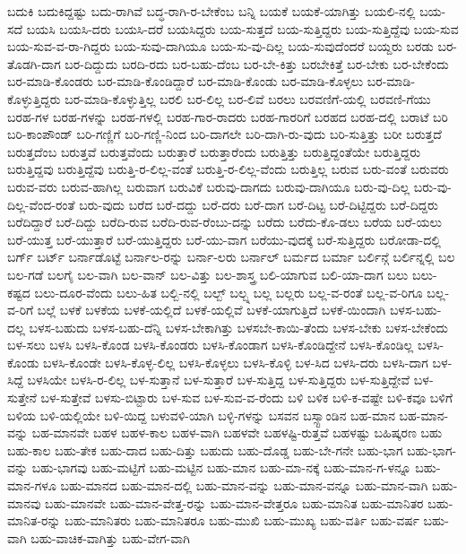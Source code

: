 {ಬದುಕಿ
ಬದುಕಿದ್ದಷ್ಟು
ಬದು-ರಾಗಿವೆ
ಬದ್ಧ-ರಾಗಿ-ರ-ಬೇಕೆಂಬ
ಬನ್ನಿ
ಬಯಕೆ
ಬಯಕೆ-ಯಾಗಿತ್ತು
ಬಯಲಿ-ನಲ್ಲಿ
ಬಯ-ಸದೆ
ಬಯಸಿ
ಬಯಸಿ-ದರು
ಬಯಸಿ-ದರೆ
ಬಯಸಿದ್ದರು
ಬಯ-ಸುತ್ತದೆ
ಬಯ-ಸುತ್ತಿದ್ದರು
ಬಯ-ಸುತ್ತಿದ್ದೆವು
ಬಯ-ಸುವ
ಬಯ-ಸುವ-ವ-ರಾ-ಗಿದ್ದರು
ಬಯ-ಸುವು-ದಾಗಿಯೂ
ಬಯ-ಸು-ವು-ದಿಲ್ಲ
ಬಯ-ಸುವುದೆಂದರೆ
ಬಯ್ದರು
ಬರಡು
ಬರ-ತೊಡಗಿ-ದಾಗ
ಬರ-ದಿದ್ದುದು
ಬರದಿ-ರದು
ಬರ-ಬಹು-ದೆಂಬ
ಬರ-ಬೇ-ಕಿತ್ತು
ಬರಬೇಕಿತ್ತೆ
ಬರ-ಬೇಕು
ಬರ-ಬೇಕೆಂದು
ಬರ-ಮಾಡಿ-ಕೊಂಡರು
ಬರ-ಮಾಡಿ-ಕೊಂಡಿದ್ದಾರೆ
ಬರ-ಮಾಡಿ-ಕೊಂಡು
ಬರ-ಮಾಡಿ-ಕೊಳ್ಳಲು
ಬರ-ಮಾಡಿ-ಕೊಳ್ಳುತ್ತಿದ್ದರು
ಬರ-ಮಾಡಿ-ಕೊಳ್ಳುತ್ತಿಲ್ಲ
ಬರಲಿ
ಬರ-ಲಿಲ್ಲ
ಬರ-ಲಿವೆ
ಬರಲು
ಬರವಣಿಗೆ-ಯಲ್ಲಿ
ಬರವಣಿ-ಗೆಯು
ಬರಹ-ಗಳ
ಬರಹ-ಗಳನ್ನು
ಬರಹ-ಗಳಲ್ಲಿ
ಬರಹ-ಗಾರ-ರಾದರು
ಬರಹ-ಗಾರರಿಗೆ
ಬರಹದ
ಬರಹ-ದಲ್ಲಿ
ಬರಾಟೆ
ಬರಿ
ಬರಿ-ಕಾಂಪೌಂಡ್
ಬರಿ-ಗಣ್ಣಿಗೆ
ಬರಿ-ಗಣ್ಣಿ-ನಿಂದ
ಬರಿ-ದಾಗಲೇ
ಬರಿ-ದಾಗಿ-ರು-ವುದು
ಬರಿ-ಸುತ್ತಿತ್ತು
ಬರೀ
ಬರುತ್ತದೆ
ಬರುತ್ತದೆಂಬ
ಬರುತ್ತವೆ
ಬರುತ್ತವೆಂದು
ಬರುತ್ತಾರೆ
ಬರುತ್ತಾರೆಂದು
ಬರುತ್ತಿತ್ತು
ಬರುತ್ತಿದ್ದಂತೆಯೇ
ಬರುತ್ತಿದ್ದರು
ಬರುತ್ತಿದ್ದವು
ಬರುತ್ತಿದ್ದೆವು
ಬರುತ್ತಿ-ರ-ಲಿಲ್ಲ-ವಂತೆ
ಬರುತ್ತಿ-ರ-ಲಿಲ್ಲ-ವೆಂದು
ಬರುತ್ತಿಲ್ಲ
ಬರುವ
ಬರು-ವಂತೆ
ಬರುವರು
ಬರುವ-ವರು
ಬರುವ-ಹಾಗಿಲ್ಲ
ಬರುವಾಗ
ಬರುವಿಕೆ
ಬರುವು-ದಾಗದು
ಬರುವು-ದಾಗಿಯೂ
ಬರು-ವು-ದಿಲ್ಲ
ಬರು-ವು-ದಿಲ್ಲ-ವೆಂದ-ರಂತೆ
ಬರು-ವುದು
ಬರೆದ
ಬರೆ-ದದ್ದು
ಬರೆ-ದರು
ಬರೆ-ದಾಗ
ಬರೆ-ದಿಟ್ಟ
ಬರೆ-ದಿಟ್ಟಿದ್ದರು
ಬರೆ-ದಿದ್ದರು
ಬರೆದಿದ್ದಾರೆ
ಬರೆ-ದಿದ್ದು
ಬರೆದಿ-ರುವ
ಬರೆದಿ-ರುವ-ರೆಂಬು-ದನ್ನು
ಬರೆದು
ಬರೆದು-ಕೊ-ಡಲು
ಬರೆಯ
ಬರೆ-ಯಲು
ಬರೆ-ಯುತ್ತ
ಬರೆ-ಯುತ್ತಾರೆ
ಬರೆ-ಯುತ್ತಿದ್ದರು
ಬರೆ-ಯು-ವಾಗ
ಬರೆಯು-ವುದಕ್ಕೆ
ಬರೆ-ಸುತ್ತಿದ್ದರು
ಬರೋಡಾ-ದಲ್ಲಿ
ಬರ್ಗ್
ಬರ್ಟ್
ಬರ್ನಾಡೊಟ್ಟೆ
ಬರ್ನಾಲ-ರನ್ನು
ಬರ್ನಾ-ಲರು
ಬರ್ನಾಲ್
ಬರ್ಮದ
ಬರ್ಮಾ
ಬರ್ಲಿನ್ಗೆ
ಬರ್ಲಿನ್ನಲ್ಲಿ
ಬಲ
ಬಲ-ಗಡೆ
ಬಲಗೈ
ಬಲ-ವಾಗಿ
ಬಲ-ವಾನ್
ಬಲ-ವಿತ್ತು
ಬಲ-ಶಾಸ್ತ್ರ
ಬಲಿ-ಯಾಗುವ
ಬಲಿ-ಯಾ-ದಾಗ
ಬಲು
ಬಲು-ಕಷ್ಟದ
ಬಲು-ದೂರ-ವೆಂದು
ಬಲು-ಹಿತ
ಬಲ್ಬಿ-ನಲ್ಲಿ
ಬಲ್ಬ್
ಬಲ್ಬ್ನ
ಬಲ್ಲ
ಬಲ್ಲರು
ಬಲ್ಲ-ವ-ರಂತೆ
ಬಲ್ಲ-ವ-ರಿಗೂ
ಬಲ್ಲ-ವ-ರಿಗೆ
ಬಲ್ಲೆ
ಬಳಕೆ
ಬಳಕೆಯ
ಬಳಕೆ-ಯಲ್ಲಿದೆ
ಬಳಕೆ-ಯಲ್ಲಿವೆ
ಬಳಕೆ-ಯಾಗುತ್ತಿದೆ
ಬಳಕೆ-ಯಿಂದಾಗಿ
ಬಳಸ-ಬಹು-ದಲ್ಲ
ಬಳಸ-ಬಹುದು
ಬಳಸ-ಬಹು-ದೆನ್ನಿ
ಬಳಸ-ಬೇಕಾಗಿತ್ತು
ಬಳಸಬೇ-ಕಾಯಿ-ತೆಂದು
ಬಳಸ-ಬೇಕು
ಬಳಸ-ಬೇಕೆಂದು
ಬಳ-ಸಲು
ಬಳಸಿ
ಬಳಸಿ-ಕೊಂಡ
ಬಳಸಿ-ಕೊಂಡರು
ಬಳಸಿ-ಕೊಂಡಾಗ
ಬಳಸಿ-ಕೊಂಡಿದ್ದೇನೆ
ಬಳಸಿ-ಕೊಂಡಿಲ್ಲ
ಬಳಸಿ-ಕೊಂಡು
ಬಳಸಿ-ಕೊಂಡೇ
ಬಳಸಿ-ಕೊಳ್ಳ-ಲಿಲ್ಲ
ಬಳಸಿ-ಕೊಳ್ಳಲು
ಬಳಸಿ-ಕೊಳ್ಳಿ
ಬಳ-ಸಿದ
ಬಳಸಿ-ದರು
ಬಳಸಿ-ದಾಗ
ಬಳ-ಸಿದ್ದೆ
ಬಳಸಿಯೇ
ಬಳಸಿ-ರ-ಲಿಲ್ಲ
ಬಳ-ಸುತ್ತಾನೆ
ಬಳ-ಸುತ್ತಾರೆ
ಬಳ-ಸುತ್ತಿದ್ದ
ಬಳ-ಸುತ್ತಿದ್ದರು
ಬಳ-ಸುತ್ತಿದ್ದೇವೆ
ಬಳ-ಸುತ್ತೇನೆ
ಬಳ-ಸುತ್ತೇವೆ
ಬಳಸು-ಬಿಟ್ಟಾರು
ಬಳ-ಸುವ
ಬಳ-ಸುವ-ವ-ರೆಂದು
ಬಳಿ
ಬಳಿಕ
ಬಳಿ-ಕ-ವಷ್ಟೇ
ಬಳಿ-ಕವೂ
ಬಳಿಗೆ
ಬಳಿಯ
ಬಳಿ-ಯಲ್ಲಿಯೇ
ಬಳಿ-ಯಿದ್ದ
ಬಳುವಳಿ-ಯಾಗಿ
ಬಳ್ಳಿ-ಗಳನ್ನು
ಬಸವನ
ಬಸ್ಸ್ಟಾಂಡಿನ
ಬಹ-ಮಾನ
ಬಹ-ಮಾನ-ವನ್ನು
ಬಹ-ಮಾನವೇ
ಬಹಳ
ಬಹಳ-ಕಾಲ
ಬಹಳ-ವಾಗಿ
ಬಹಳವೇ
ಬಹಳಷ್ಟಿ-ರುತ್ತವೆ
ಬಹಳಷ್ಟು
ಬಹಿಷ್ಕರಣ
ಬಹು
ಬಹು-ಕಾಲ
ಬಹು-ತೇಕ
ಬಹು-ದಾದ
ಬಹು-ದಿತ್ತು
ಬಹುದು
ಬಹು-ದೊಡ್ಡ
ಬಹು-ಬೇ-ಗನೇ
ಬಹು-ಭಾಗ
ಬಹು-ಭಾಗ-ವನ್ನು
ಬಹು-ಭಾಗವು
ಬಹು-ಮಟ್ಟಿಗೆ
ಬಹು-ಮಟ್ಟಿನ
ಬಹು-ಮಾನ
ಬಹು-ಮಾ-ನಕ್ಕೆ
ಬಹು-ಮಾನ-ಗ-ಳನ್ನೂ
ಬಹು-ಮಾನ-ಗಳೂ
ಬಹು-ಮಾನದ
ಬಹು-ಮಾನ-ದಲ್ಲಿ
ಬಹು-ಮಾನ-ವನ್ನು
ಬಹು-ಮಾನ-ವನ್ನೂ
ಬಹು-ಮಾನ-ವಾಗಿ
ಬಹು-ಮಾನವು
ಬಹು-ಮಾನವೇ
ಬಹು-ಮಾನ-ವೇತ್ತ-ರನ್ನು
ಬಹು-ಮಾನ-ವೇತ್ತರೂ
ಬಹು-ಮಾನಿತ
ಬಹು-ಮಾನಿತರ
ಬಹು-ಮಾನಿತ-ರನ್ನು
ಬಹು-ಮಾನಿತರು
ಬಹು-ಮಾನಿತರೂ
ಬಹು-ಮುಖಿ
ಬಹು-ಮುಖ್ಯ
ಬಹು-ವರ್ತಿ
ಬಹು-ವರ್ಷ
ಬಹು-ವಾಗಿ
ಬಹು-ವಾಚಿಕ-ವಾಗಿತ್ತು
ಬಹು-ವೇಗ-ವಾಗಿ
}
